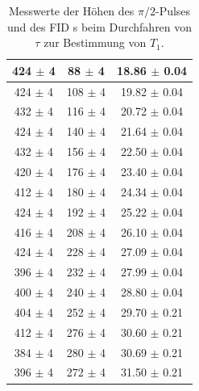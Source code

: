 \documentclass[12pt,a4paper]{article}
\begin{document}
\begin{table}
\begin{tabular}{|c|c|c|}
\hline 
424 $\pm$ 4 & 88 $\pm$ 4 & 18.86 $\pm$ 0.04 \\ 
\hline 
424 $\pm$ 4 & 108 $\pm$ 4 & 19.82 $\pm$ 0.04 \\ 
\hline 
432 $\pm$ 4 & 116 $\pm$ 4 & 20.72 $\pm$ 0.04 \\ 
\hline 
424 $\pm$ 4 & 140 $\pm$ 4 & 21.64 $\pm$ 0.04 \\ 
\hline 
432 $\pm$ 4 & 156 $\pm$ 4 & 22.50 $\pm$ 0.04 \\ 
\hline 
420 $\pm$ 4 & 176 $\pm$ 4 & 23.40 $\pm$ 0.04 \\ 
\hline 
412 $\pm$ 4 & 180 $\pm$ 4 & 24.34 $\pm$ 0.04 \\ 
\hline 
424 $\pm$ 4 & 192 $\pm$ 4 & 25.22 $\pm$ 0.04 \\ 
\hline 
416 $\pm$ 4 & 208 $\pm$ 4 & 26.10 $\pm$ 0.04 \\ 
\hline 
424 $\pm$ 4 & 228 $\pm$ 4 & 27.09 $\pm$ 0.04 \\ 
\hline 
396 $\pm$ 4 & 232 $\pm$ 4 & 27.99 $\pm$ 0.04 \\ 
\hline 
400 $\pm$ 4 & 240 $\pm$ 4 & 28.80 $\pm$ 0.04 \\ 
\hline 
404 $\pm$ 4 & 252 $\pm$ 4 & 29.70 $\pm$ 0.21 \\ 
\hline 
412 $\pm$ 4 & 276 $\pm$ 4 & 30.60 $\pm$ 0.21 \\ 
\hline 
384 $\pm$ 4 & 280 $\pm$ 4 & 30.69 $\pm$ 0.21 \\ 
\hline 
396 $\pm$ 4 & 272 $\pm$ 4 & 31.50 $\pm$ 0.21 \\ 
\hline 
\end{tabular} 
\caption{Messwerte der Höhen des $\pi /2$-Pulses und des FID s beim Durchfahren von $\tau$ zur Bestimmung von $T_1$.}
\label{tab:T1_Daten}
\end{table}
\end{document}
